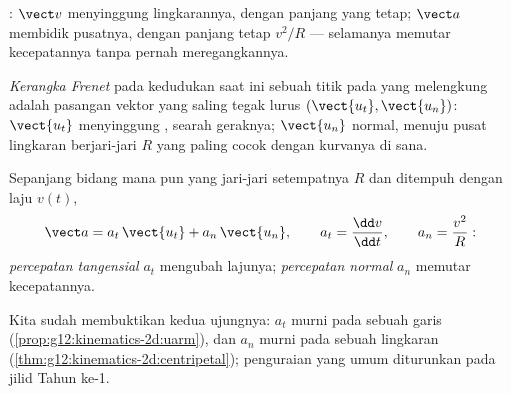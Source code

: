 \begin{omfigure}

{\small {}: $\vect v$ menyinggung lingkarannya,
dengan panjang yang tetap; $\vect a$ membidik pusatnya, dengan panjang
tetap $v^2/R$ --- selamanya memutar kecepatannya tanpa pernah
meregangkannya.}
\end{omfigure}

\begin{definition}\label{def:g12:kinematics-2d:frenet}
\emph{Kerangka Frenet} pada kedudukan saat ini
sebuah titik pada  yang melengkung adalah pasangan vektor 
yang saling tegak lurus $(\vect{u_t}, \vect{u_n})$: $\vect{u_t}$
menyinggung , searah geraknya; $\vect{u_n}$ normal, menuju
pusat lingkaran berjari-jari $R$ yang paling cocok dengan kurvanya di
sana.
\end{definition}

\begin{proposition}\label{prop:g12:kinematics-2d:frenetacc}
Sepanjang  bidang mana pun yang jari-jari setempatnya $R$ dan
ditempuh dengan laju $v(t)$,
\[
\vect a = a_t\,\vect{u_t} + a_n\,\vect{u_n},
\qquad a_t = \frac{\dd v}{\dd t},
\qquad a_n = \frac{v^2}{R}:
\]
\emph{percepatan tangensial} $a_t$
mengubah lajunya; \emph{percepatan normal}
$a_n$ memutar kecepatannya.
\end{proposition}
\admitted

\begin{remark}\label{rem:g12:kinematics-2d:frenetproof}
Kita sudah membuktikan kedua ujungnya: $a_t$ murni pada sebuah garis
(\cref{prop:g12:kinematics-2d:uarm}), dan $a_n$ murni pada sebuah
lingkaran (\cref{thm:g12:kinematics-2d:centripetal}); penguraian yang
umum diturunkan pada jilid Tahun ke-1.
\end{remark}

